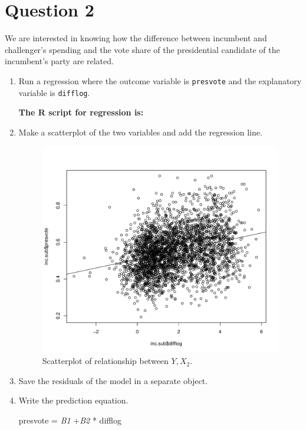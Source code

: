 \documentclass[12pt,letterpaper]{article}
\begin{document}
\newpage

\section*{Question 2}
\noindent We are interested in knowing how the difference between incumbent and challenger's spending and the vote share of the presidential candidate of the incumbent's party are related.	\vspace{.25cm}
	\begin{enumerate}
		\item Run a regression where the outcome variable is \texttt{presvote} and the explanatory variable is \texttt{difflog}.
		
		
		
		\textbf{		The R script for regression is:}
		  
		
		

		
		\item Make a scatterplot of the two variables and add the regression line. 
		
			  
		
		
		\begin{figure}[h!]\centering	\caption{\footnotesize Scatterplot of relationship between $Y, X_2$.}	
			
			\includegraphics[width=.7\textwidth]{plot2.pdf}
			
		\end{figure}
		
		\newpage	
		\item Save the residuals of the model in a separate object.
		
		
		
		
		
		
		\item Write the prediction equation.
		
		
		presvote = \textit{B1} +\textit{B2} * difflog
		
		
	\end{enumerate}
	
\end{document}
